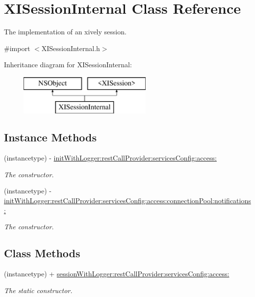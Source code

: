 \hypertarget{interface_x_i_session_internal}{}\section{X\+I\+Session\+Internal Class Reference}
\label{interface_x_i_session_internal}


The implementation of an xively session.  




{\ttfamily \#import $<$X\+I\+Session\+Internal.\+h$>$}

Inheritance diagram for X\+I\+Session\+Internal\+:\begin{figure}[H]
\begin{center}
\leavevmode
\includegraphics[height=2.000000cm]{interface_x_i_session_internal}
\end{center}
\end{figure}
\subsection*{Instance Methods}
\begin{DoxyCompactItemize}
\item 
(instancetype) -\/ \hyperlink{interface_x_i_session_internal_aecd47a945b3c947b44952fceb6272386}{init\+With\+Logger\+:rest\+Call\+Provider\+:services\+Config\+:access\+:}
\begin{DoxyCompactList}\small\item\em The constructor. \end{DoxyCompactList}\item 
(instancetype) -\/ \hyperlink{interface_x_i_session_internal_a1d6df5dc95c8bde9c2b6d9a4e2a8608e}{init\+With\+Logger\+:rest\+Call\+Provider\+:services\+Config\+:access\+:connection\+Pool\+:notifications\+:}
\begin{DoxyCompactList}\small\item\em The constructor. \end{DoxyCompactList}\end{DoxyCompactItemize}
\subsection*{Class Methods}
\begin{DoxyCompactItemize}
\item 
(instancetype) + \hyperlink{interface_x_i_session_internal_ad39662246a3026dd1e2367540ba26dfa}{session\+With\+Logger\+:rest\+Call\+Provider\+:services\+Config\+:access\+:}
\begin{DoxyCompactList}\small\item\em The static constructor. \end{DoxyCompactList}\end{DoxyCompactItemize}
